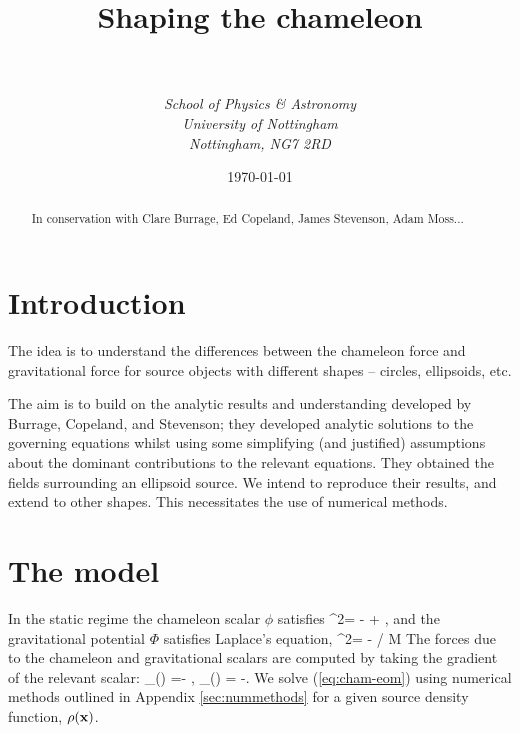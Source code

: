 \documentclass[a4paper, 12pt]{article}
\numberwithin{equation}{section}
\begin{document}
\title{{\bf Shaping the chameleon}}
\author{\\ \\ \it{School of Physics \& Astronomy} \\ \it{University of Nottingham} \\ \it{Nottingham, NG7 2RD}}

\date{\today}



\maketitle
\begin{abstract}
In conservation with Clare Burrage, Ed Copeland, James Stevenson, Adam Moss...
\end{abstract}

\tableofcontents   


\section{Introduction}
The idea is to understand the differences between the chameleon force and gravitational force for source objects with different shapes -- circles, ellipsoids, etc.

The aim is to build on the analytic results and understanding developed by Burrage, Copeland, and Stevenson; they developed analytic solutions to the governing equations whilst using some simplifying (and justified) assumptions about the dominant contributions to the relevant equations. They obtained the fields surrounding an ellipsoid source. We intend to reproduce their results, and extend to other shapes. This necessitates the use of numerical methods.




\section{The model}
In the static regime the chameleon scalar $\phi$ satisfies
\bse
\bea
\label{eq:cham-eom}
\nabla^2\phi = - + ,
\eea
and the gravitational potential $\Phi$ satisfies Laplace's equation,
\bea
\label{eq:laplaceseqn}
\nabla^2\Phi = - \rho / M
\eea
\ese
The forces due to the chameleon and gravitational scalars are computed by taking the gradient of the relevant scalar:
\bea
\label{eq:forces}
_{(\phi)} =- \nabla\phi,\qquad
{}_{(\Phi)} = -\nabla\Phi.
\eea
We solve (\ref{eq:cham-eom}) using numerical methods outlined in Appendix \ref{sec:nummethods} for a given  source density function, $\rho({\bf{x}})$. 
\end{document}
